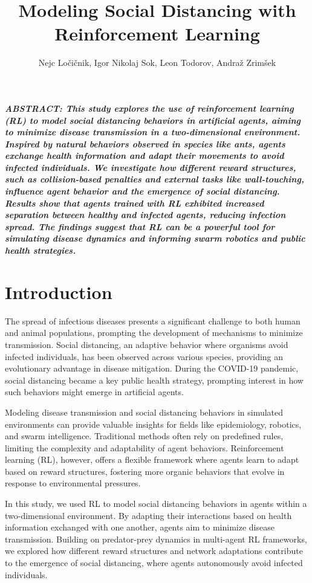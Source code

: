 \documentclass[9pt]{IEEEtran}
\title{\vspace{0ex}
Modeling Social Distancing with Reinforcement Learning}
\author{Nejc Ločičnik, Igor Nikolaj Sok, Leon Todorov, Andraž Zrimšek \vspace{-4.0ex}}
\begin{document}
\maketitle

\noindent\textit{\textbf{ABSTRACT: This study explores the use of reinforcement learning (RL) to model social distancing behaviors in artificial agents, aiming to minimize disease transmission in a two-dimensional environment. Inspired by natural behaviors observed in species like ants, agents exchange health information and adapt their movements to avoid infected individuals. We investigate how different reward structures, such as collision-based penalties and external tasks like wall-touching, influence agent behavior and the emergence of social distancing. Results show that agents trained with RL exhibited increased separation between healthy and infected agents, reducing infection spread. The findings suggest that RL can be a powerful tool for simulating disease dynamics and informing swarm robotics and public health strategies.}}

\section{Introduction}

The spread of infectious diseases presents a significant challenge to both human and animal populations, prompting the development of mechanisms to minimize transmission. Social distancing, an adaptive behavior where organisms avoid infected individuals, has been observed across various species, providing an evolutionary advantage in disease mitigation. During the COVID-19 pandemic, social distancing became a key public health strategy, prompting interest in how such behaviors might emerge in artificial agents.

Modeling disease transmission and social distancing behaviors in simulated environments can provide valuable insights for fields like epidemiology, robotics, and swarm intelligence. Traditional methods often rely on predefined rules, limiting the complexity and adaptability of agent behaviors. Reinforcement learning (RL), however, offers a flexible framework where agents learn to adapt based on reward structures, fostering more organic behaviors that evolve in response to environmental pressures.

In this study, we used RL to model social distancing behaviors in agents within a two-dimensional environment. By adapting their interactions based on health information exchanged with one another, agents aim to minimize disease transmission. Building on predator-prey dynamics in multi-agent RL frameworks, we explored how different reward structures and network adaptations contribute to the emergence of social distancing, where agents autonomously avoid infected individuals.
\end{document}
